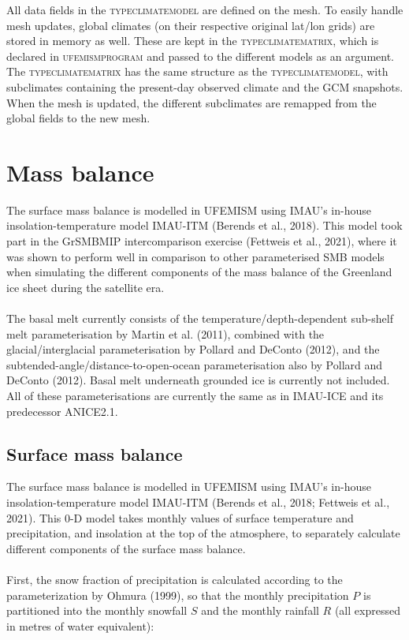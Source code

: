 \documentclass{article}
\begin{document}
All data fields in the \textsc{type\textunderscore climate\textunderscore model} are defined on the mesh. To easily handle mesh updates, global climates (on their respective original lat/lon grids) are stored in memory as well. These are kept in the \textsc{type\textunderscore climate\textunderscore matrix}, which is declared in \textsc{ufemism\textunderscore program} and passed to the different models as an argument. The \textsc{type\textunderscore climate\textunderscore matrix} has the same structure as the \textsc{type\textunderscore climate\textunderscore model}, with subclimates containing the present-day observed climate and the GCM snapshots. When the mesh is updated, the different subclimates are remapped from the global fields to the new mesh.

\newpage
\section{Mass balance}

The surface mass balance is modelled in UFEMISM using IMAU's in-house insolation-temperature model IMAU-ITM (Berends et al., 2018). This model took part in the GrSMBMIP intercomparison exercise (Fettweis et al., 2021), where it was shown to perform well in comparison to other parameterised SMB models when simulating the different components of the mass balance of the Greenland ice sheet during the satellite era.\\
\\
The basal melt currently consists of the temperature/depth-dependent sub-shelf melt parameterisation by Martin et al. (2011), combined with the glacial/interglacial parameterisation by Pollard and DeConto (2012), and the subtended-angle/distance-to-open-ocean parameterisation also by Pollard and DeConto (2012). Basal melt underneath grounded ice is currently not included. All of these parameterisations are currently the same as in IMAU-ICE and its predecessor ANICE2.1.

\subsection{Surface mass balance}

The surface mass balance is modelled in UFEMISM using IMAU's in-house insolation-temperature model IMAU-ITM (Berends et al., 2018; Fettweis et al., 2021). This 0-D model takes monthly values of surface temperature and precipitation, and insolation at the top of the atmosphere, to separately calculate different components of the surface mass balance.\\
\\
First, the snow fraction of precipitation is calculated according to the parameterization by Ohmura (1999), so that the  monthly precipitation $P$ is partitioned into the monthly snowfall $S$ and the monthly rainfall $R$ (all expressed in metres of water equivalent):
\end{document}
